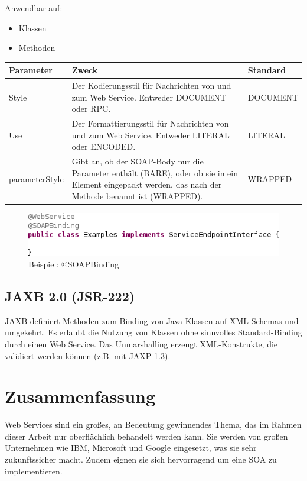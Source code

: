 \documentclass[runningheads]{llncs}
\newcommand{\germanquote}[1]{\glqq{}#1\grqq{}}
\newcommand{\anntabwidth}{\textwidth}
\begin{document}
      \noindent{}Anwendbar auf:
      \begin{itemize}
       \item Klassen
       \item Methoden\vfill
      \end{itemize}
    \tymin=75pt
    \begin{tabulary}{\anntabwidth}{|l|L|L|}
    \hline
    \textbf{Parameter} & \textbf{Zweck} & \textbf{Standard} \\
    \hline
      Style &
      Der Kodierungsstil für Nachrichten von und zum Web Service. Entweder \germanquote{DOCUMENT}
      oder \germanquote{RPC}. &
      DOCUMENT \\
    \hline
      Use &
      Der Formattierungsstil für Nachrichten von und zum Web Service. Entweder
      \germanquote{LITERAL} oder \germanquote{ENCODED}. &
      LITERAL \\
    \hline
      parameterStyle &
      Gibt an, ob der SOAP-Body nur die Parameter enthält (\germanquote{BARE}), oder ob sie in ein
      Element eingepackt werden, das nach der Methode benannt ist (\germanquote{WRAPPED}). &
      WRAPPED \\
    \hline
    \end{tabulary} \vfill
    \tymin=10pt
    \begin{figure}[tbh]
      \centering
      \includegraphics[width=\textwidth]{../images/AtSOAPBinding.png}
      \caption{Beispiel: @SOAPBinding}
      \label{fig:soapb}
    \end{figure} \vfill


  \label{jsr222}
  \subsection{JAXB 2.0 (JSR-222)}
    JAXB\cite{jsr_222} definiert Methoden zum Binding von Java-Klassen auf XML-Schemas und
    umgekehrt. Es erlaubt die Nutzung von Klassen ohne sinnvolles Standard-Binding durch einen Web
    Service. Das Unmarshalling erzeugt XML-Konstrukte, die validiert werden können (z.B. mit JAXP
    1.3).

  \label{summary}
  \section{Zusammenfassung}
    Web Services sind ein großes, an Bedeutung gewinnendes Thema, das im Rahmen dieser Arbeit nur oberflächlich behandelt werden kann. Sie werden von großen Unternehmen wie IBM, Microsoft und Google eingesetzt, was sie sehr zukunftssicher macht. Zudem eignen sie sich hervorragend um eine SOA zu implementieren.


  \newpage

  \newpage
  \begin{flushleft}
    
    
  \end{flushleft}
\end{document}
